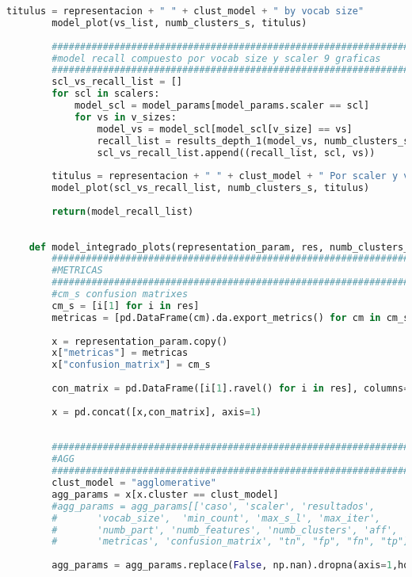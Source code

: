 \documentclass[12pt]{article}
\begin{document}
\begin{lstlisting}[language=Python, caption = Rutina de Visualización]
	    titulus = representacion + " " + clust_model + " by vocab size"
	    model_plot(vs_list, numb_clusters_s, titulus)
	    
	    ##########################################################################
	    #model recall compuesto por vocab size y scaler 9 graficas
	    ##########################################################################
	    scl_vs_recall_list = []
	    for scl in scalers:
	        model_scl = model_params[model_params.scaler == scl]
	        for vs in v_sizes:
	            model_vs = model_scl[model_scl[v_size] == vs]
	            recall_list = results_depth_1(model_vs, numb_clusters_s)            
	            scl_vs_recall_list.append((recall_list, scl, vs))
	                
	    titulus = representacion + " " + clust_model + " Por scaler y vocab size"
	    model_plot(scl_vs_recall_list, numb_clusters_s, titulus)
	    
	    return(model_recall_list)
	
	
	def model_integrado_plots(representation_param, res, numb_clusters_s, v_sizes, scalers, representacion):
	    #############################################################################
	    #METRICAS
	    #############################################################################
	    #cm_s confusion matrixes
	    cm_s = [i[1] for i in res]
	    metricas = [pd.DataFrame(cm).da.export_metrics() for cm in cm_s]
	    
	    x = representation_param.copy()
	    x["metricas"] = metricas
	    x["confusion_matrix"] = cm_s
	    
	    con_matrix = pd.DataFrame([i[1].ravel() for i in res], columns=["tn", "fp", "fn", "tp"])
	    
	    x = pd.concat([x,con_matrix], axis=1)
	    
	    
	    #############################################################################
	    #AGG
	    #############################################################################
	    clust_model = "agglomerative"
	    agg_params = x[x.cluster == clust_model]
	    #agg_params = agg_params[['caso', 'scaler', 'resultados',
	    #       'vocab_size',  'min_count', 'max_s_l', 'max_iter',
	    #       'numb_part', 'numb_features', 'numb_clusters', 'aff', 'link', 
	    #       'metricas', 'confusion_matrix', "tn", "fp", "fn", "tp"]]
	     
	    agg_params = agg_params.replace(False, np.nan).dropna(axis=1,how="all")
	    

\end{lstlisting}
\end{document}
